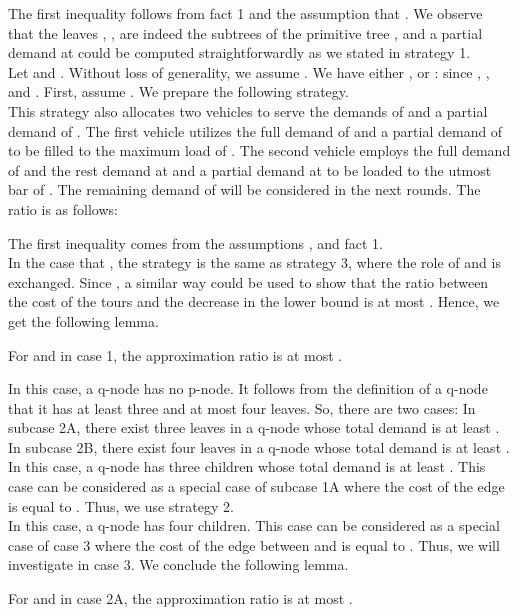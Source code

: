  \noindent The first inequality follows from fact 1 and the assumption that . We observe that the leaves , , are indeed the subtrees of the primitive tree , and a partial demand at  could be computed straightforwardly as we stated in strategy 1. \\

 \indent  Let  and . Without loss of generality, we assume . We have either , or : since , , and . First, assume . We prepare the following strategy. \\
 
\indent  This strategy also allocates two vehicles to serve the demands of  and a partial demand of . The first vehicle utilizes the full demand of  and a partial demand of  to be filled to the maximum load of . The second vehicle employs the full demand of  and the rest demand at  and a partial demand at  to be loaded to the utmost bar of . The remaining demand of  will be considered in the next rounds. The ratio is as follows:


\noindent The first inequality comes from the assumptions ,  and fact 1. \\
\indent In the case that , the strategy is the same as strategy 3, where the role of  and  is exchanged. Since , a similar way could be used to show that the ratio between the cost of the tours and the decrease in the lower bound is at most . Hence, we get the following lemma.
 \begin{lemma}
For  and in case 1, the approximation ratio is at most .
\end{lemma}

\indent  In this case, a q-node has no p-node. It follows from the definition of a q-node that it has at least three and at most four leaves. So, there are two cases: In subcase 2A, there exist three leaves in a q-node  whose total demand is at least . In subcase 2B, there exist four leaves in a q-node whose total demand is at least . \\
\indent  In this case, a q-node  has three children whose total demand is at least . This case can be considered as a special case of subcase 1A where the cost of the edge  is equal to . Thus, we use strategy 2.\\
\indent  In this case, a q-node  has four children. This case can be considered as a special case of case 3 where the cost of the edge between  and  is equal to . Thus, we will investigate in case 3. We conclude the following lemma.
\begin{lemma}
For  and in case 2A, the approximation ratio is at most .
\end{lemma}

